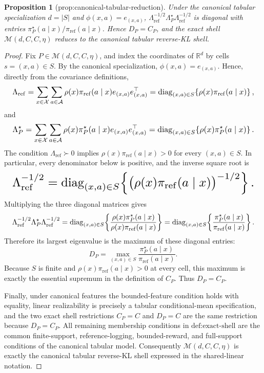 \documentclass{article}
\newtheorem{proposition}{Proposition}
\begin{document}
\begin{proposition}[prop:canonical-tabular-reduction]\label{prop:canonical-tabular-reduction}
Under the canonical tabular specialization \(d=|S|\) and \(\phi(x,a)=e_{(x,a)}\), \(\Lambda_{\mathrm{ref}}^{-1/2}\Lambda_P^\star\Lambda_{\mathrm{ref}}^{-1/2}\) is diagonal with entries \(\pi_P^\star(a\mid x)/\pi_{\mathrm{ref}}(a\mid x)\). Hence \(D_P=C_P\), and the exact shell \(\mathcal M(d,C,C,\eta)\) reduces to the canonical tabular reverse-KL shell.
\end{proposition}
\begin{proof}
Fix \(P\in\mathcal M(d,C,C,\eta)\), and index the coordinates of \(\mathbb R^d\) by cells \(s=(x,a)\in S\). By the canonical specialization, \(\phi(x,a)=e_{(x,a)}\). Hence, directly from the covariance definitions,
\[
\makebox[\linewidth][c]{\resizebox{0.98\linewidth}{!}{\(\displaystyle \Lambda_{\mathrm{ref}}
 =\sum_{x\in\mathcal X}\sum_{a\in\mathcal A}
 \rho(x)\pi_{\mathrm{ref}}(a\mid x)e_{(x,a)}e_{(x,a)}^\top
 =\operatorname{diag}_{(x,a)\in S}\!\left\{\rho(x)\pi_{\mathrm{ref}}(a\mid x)\right\},\)}}
\]
and
\[
\makebox[\linewidth][c]{\resizebox{0.98\linewidth}{!}{\(\displaystyle \Lambda_P^\star
 =\sum_{x\in\mathcal X}\sum_{a\in\mathcal A}
 \rho(x)\pi_P^\star(a\mid x)e_{(x,a)}e_{(x,a)}^\top
 =\operatorname{diag}_{(x,a)\in S}\!\left\{\rho(x)\pi_P^\star(a\mid x)\right\}.\)}}
\]
The condition \(\Lambda_{\mathrm{ref}}\succ0\) implies
\(\rho(x)\pi_{\mathrm{ref}}(a\mid x)>0\) for every \((x,a)\in S\). In particular, every denominator below is positive, and the inverse square root is
\[
\makebox[\linewidth][c]{\resizebox{0.98\linewidth}{!}{\(\displaystyle \Lambda_{\mathrm{ref}}^{-1/2}
 =\operatorname{diag}_{(x,a)\in S}\!\left\{\bigl(\rho(x)\pi_{\mathrm{ref}}(a\mid x)\bigr)^{-1/2}\right\}.\)}}
\]
Multiplying the three diagonal matrices gives
\[
\makebox[\linewidth][c]{\resizebox{0.98\linewidth}{!}{\(\displaystyle \Lambda_{\mathrm{ref}}^{-1/2}\Lambda_P^\star\Lambda_{\mathrm{ref}}^{-1/2}
 =\operatorname{diag}_{(x,a)\in S}\!\left\{
 \frac{\rho(x)\pi_P^\star(a\mid x)}{\rho(x)\pi_{\mathrm{ref}}(a\mid x)}
 \right\}
 =\operatorname{diag}_{(x,a)\in S}\!\left\{
 \frac{\pi_P^\star(a\mid x)}{\pi_{\mathrm{ref}}(a\mid x)}
 \right\}.\)}}
\]
Therefore its largest eigenvalue is the maximum of these diagonal entries:
\[
D_P
 =\max_{(x,a)\in S}
 \frac{\pi_P^\star(a\mid x)}{\pi_{\mathrm{ref}}(a\mid x)}.
\]
Because \(S\) is finite and \(\rho(x)\pi_{\mathrm{ref}}(a\mid x)>0\) at every cell, this maximum is exactly the essential supremum in the definition of \(C_P\). Thus \(D_P=C_P\).

Finally, under canonical features the bounded-feature condition holds with equality, linear realizability is precisely a tabular conditional-mean specification, and the two exact shell restrictions \(C_P=C\) and \(D_P=C\) are the same restriction because \(D_P=C_P\). All remaining membership conditions in \(\text{def:exact-shell}\) are the common finite-support, reference-logging, bounded-reward, and full-support conditions of the canonical tabular model. Consequently \(\mathcal M(d,C,C,\eta)\) is exactly the canonical tabular reverse-KL shell expressed in the shared-linear notation.
\end{proof}
\end{document}
